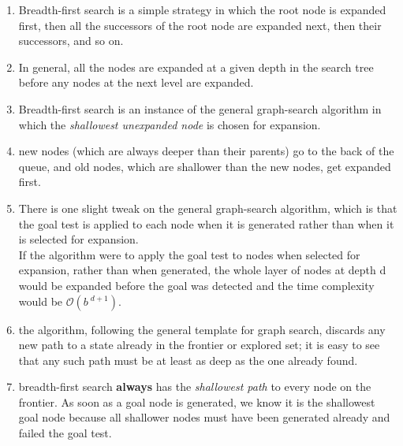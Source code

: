 \begin{enumerate}
    \item Breadth-first search is a simple strategy in which the root node is expanded first, then all the successors of the root node are expanded next, then their successors, and so on.
    \hfill \cite{ai/book/Artificial-Intelligence-A-Modern-Approach/Russell-Norvig}

    \item In general, all the nodes are expanded at a given depth in the search tree before any nodes at the next level are expanded.
    \hfill \cite{ai/book/Artificial-Intelligence-A-Modern-Approach/Russell-Norvig}

    \item Breadth-first search is an instance of the general graph-search algorithm in which the \textit{shallowest unexpanded node} is chosen for expansion.
    \hfill \cite{ai/book/Artificial-Intelligence-A-Modern-Approach/Russell-Norvig}

    \item new nodes (which are always deeper than their parents) go to the back of the queue, and old nodes, which are shallower than the new nodes, get expanded first.
    \hfill \cite{ai/book/Artificial-Intelligence-A-Modern-Approach/Russell-Norvig}

    \item There is one slight tweak on the general graph-search algorithm, which is that the goal test is applied to each node when it is generated rather than when it is selected for expansion.
    \hfill \cite{ai/book/Artificial-Intelligence-A-Modern-Approach/Russell-Norvig}
    \\
    If the algorithm were to apply the goal test to nodes when selected for expansion, rather than when generated, the whole layer of nodes at depth d would be expanded before the goal was detected and the time complexity would be $\mathcal{O}(b\ ^{d+1})$.
    \hfill \cite{ai/book/Artificial-Intelligence-A-Modern-Approach/Russell-Norvig}

    \item the algorithm, following the general template for graph search, discards any new path to a state already in the frontier or explored set; it is easy to see that any such path must be at least as deep as the one already found.
    \hfill \cite{ai/book/Artificial-Intelligence-A-Modern-Approach/Russell-Norvig}

    \item breadth-first search \textbf{always} has the \textit{shallowest path} to every node on the frontier.
    As soon as a goal node is generated, we know it is the shallowest goal node because all shallower nodes must have been generated already and failed the goal test.
    \hfill \cite{ai/book/Artificial-Intelligence-A-Modern-Approach/Russell-Norvig}


\end{enumerate}
